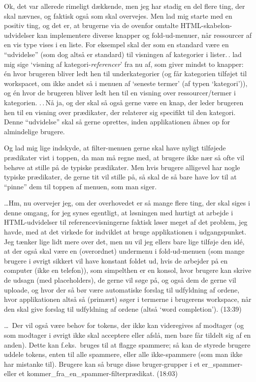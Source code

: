 \documentclass{report}
\begin{document}
Ok, det var allerede rimeligt dækkende, men jeg har stadig en del flere ting, der skal nævnes, og faktisk også som skal overvejes. Men lad mig starte med en positiv ting, og det er, at brugerne via de ovenfor omtalte HTML-skabelon-udvidelser kan implementere diverse knapper og fold-ud-menuer, når ressourcer af en vis type vises i en liste. For eksempel skal der som en standard være en ``udvidelse'' (som dog altså er standard) til visningen af kategorier i lister.\,. lad mig sige `visning af kategori-\emph{referencer}' fra nu af, som giver mindst to knapper: én hvor brugeren bliver ledt hen til underkategorier (og får kategorien tilføjet til workspacet, om ikke andet så i menuen af `seneste termer' (af typen `kategori')), og én hvor de brugeren bliver ledt hen til en visning over ressourcer/termer i kategorien. .\,.\,Nå ja, og der skal så også gerne være en knap, der leder brugeren hen til en visning over prædikater, der relaterer sig specifikt til den kategori. Denne ``udvidelse'' skal så gerne oprettes, inden applikationen åbnes op for almindelige brugere. 

Og lad mig lige indskyde, at filter-menuen gerne skal have nyligt tilføjede prædikater vist i toppen, da man må regne med, at brugere ikke nær så ofte vil behøve at stille på de typiske prædikater. Men hvis brugere alligevel har nogle typiske prædikater, de gerne tit vil stille på, så skal de så bare have lov til at ``pinne'' dem til toppen af menuen, som man siger. 

\ldots Hm, nu overvejer jeg, om der overhovedet er så mange flere ting, der skal siges i denne omgang, for jeg synes egentligt, at løsningen med hurtigt at arbejde i HTML-udvidelser til referencevisningerne faktisk løser meget af det problem, jeg havde, med at det virkede for indviklet at bruge applikationen i udgangspunket. Jeg tænker lige lidt mere over det, men nu vil jeg ellers bare lige tilføje den idé, at der også skal være en (overordnet) undermenu i fold-ud-menuen (som mange brugere i øvrigt sikkert vil have konstant foldet ud, hvis de arbejder på en computer (ikke en telefon)), som simpelthen er en konsol, hvor brugere kan skrive de udsagn (med placeholders), de gerne vil søge på, og også dem de gerne vil uploade, og hvor der så bør være automatiske forslag til udfyldning af ordene, hvor applikationen altså så (primært) søger i termerne i brugerens workspace, når den skal give forslag til udfyldning af ordene (altså `word completion'). (13:39)  

\ldots\ Der vil også være behov for tokens, der ikke kan videregives af modtager (og som modtager i øvrigt ikke skal acceptere eller afslå, men bare får tildelt sig af en anden). Dette kan f.eks.\ bruges til at flagge spammere; så kan de styrede brugere uddele tokens, enten til alle spammere, eller alle ikke-spammere (som man ikke har mistanke til). Brugere kan så bruge disse bruger-grupper i et er\_spammer- eller et kommer\_fra\_en\_spammer-filterprædikat. (18:03)
\end{document}
